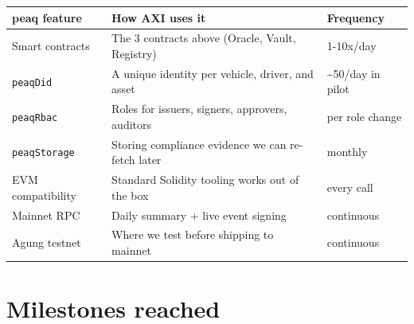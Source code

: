 \documentclass[11pt,a4paper]{article}
\begin{document}
\begin{center}
\begin{tabular}{p{3.8cm} p{8.5cm} p{2.5cm}}
\toprule
{\bfseries\color{axiprimary}peaq feature} & {\bfseries\color{axiprimary}How AXI uses it} & {\bfseries\color{axiprimary}Frequency} \\
\midrule
Smart contracts & The 3 contracts above (Oracle, Vault, Registry) & 1-10x/day \\
\addlinespace[2pt]
\texttt{peaqDid} & A unique identity per vehicle, driver, and asset & \textasciitilde 50/day in pilot \\
\addlinespace[2pt]
\texttt{peaqRbac} & Roles for issuers, signers, approvers, auditors & per role change \\
\addlinespace[2pt]
\texttt{peaqStorage} & Storing compliance evidence we can re-fetch later & monthly \\
\addlinespace[2pt]
EVM compatibility & Standard Solidity tooling works out of the box & every call \\
\addlinespace[2pt]
Mainnet RPC & Daily summary + live event signing & continuous \\
\addlinespace[2pt]
Agung testnet & Where we test before shipping to mainnet & continuous \\
\bottomrule
\end{tabular}
\end{center}

\newpage
\section{Milestones reached}
\end{document}
